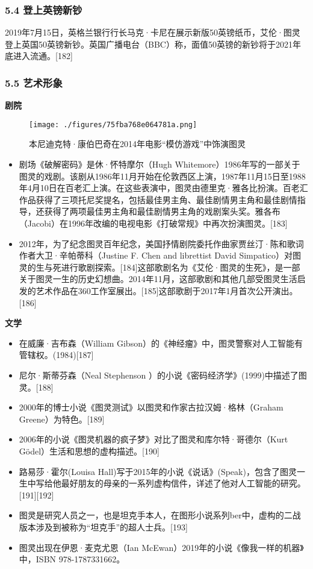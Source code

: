 \subsubsection{5.4 登上英镑新钞}
2019年7月15日，英格兰银行行长马克·卡尼在展示新版50英镑纸币，艾伦·图灵登上英国50英镑新钞。英国广播电台（BBC）称，面值50英镑的新钞将于2021年底进入流通。[182]
\subsubsection{5.5 艺术形象}
\textbf{剧院}
\begin{figure}[ht]
\centering
\texttt{[image: ./figures/75fba768e064781a.png]}
\caption{本尼迪克特·康伯巴奇在2014年电影“模仿游戏”中饰演图灵} \label{fig_ALTL_14}
\end{figure}
\begin{itemize}
\item 剧场《破解密码》是休·怀特摩尔（Hugh Whitemore）1986年写的一部关于图灵的戏剧。该剧从1986年11月开始在伦敦西区上演，1987年11月15日至1988年4月10日在百老汇上演。在这些表演中，图灵由德里克·雅各比扮演。百老汇作品获得了三项托尼奖提名，包括最佳男主角、最佳剧情男主角和最佳剧情指导，还获得了两项最佳男主角和最佳剧情男主角的戏剧案头奖。雅各布（Jacobi）在1996年改编的电视电影《打破常规》中再次扮演图灵。[183]
\item 2012年，为了纪念图灵百年纪念，美国抒情剧院委托作曲家贾丝汀·陈和歌词作者大卫·辛帕蒂科（Justine F. Chen and librettist David Simpatico）对图灵的生与死进行歌剧探索。[184]这部歌剧名为《艾伦·图灵的生死》，是一部关于图灵一生的历史幻想曲。2014年11月，这部歌剧和其他几部受图灵生活启发的艺术作品在360工作室展出。[185]这部歌剧于2017年1月首次公开演出。[186]
\end{itemize}

\textbf{文学}
\begin{itemize}
\item 在威廉·吉布森（William Gibson）的《神经瘤》中，图灵警察对人工智能有管辖权。(1984)[187]
\item 尼尔·斯蒂芬森（Neal Stephenson ）的小说《密码经济学》(1999)中描述了图灵。[188]
\item 2000年的博士小说《图灵测试》以图灵和作家古拉汉姆·格林（Graham Greene）为特色。[189]
\item 2006年的小说《图灵机器的疯子梦》对比了图灵和库尔特·哥德尔（Kurt Gödel）生活和思想的虚构描述。[190]
\item 路易莎·霍尔(Louisa Hall)写于2015年的小说《说话》(Speak)，包含了图灵一生中写给他最好朋友的母亲的一系列虚构信件，详述了他对人工智能的研究。[191][192]
\item 图灵是研究人员之一，也是坦克手本人，在图形小说系列ber中，虚构的二战版本涉及到被称为“坦克手”的超人士兵。[193]
\item 图灵出现在伊恩·麦克尤恩（Ian McEwan）2019年的小说《像我一样的机器》中，ISBN 978-1787331662。
\end{itemize}

